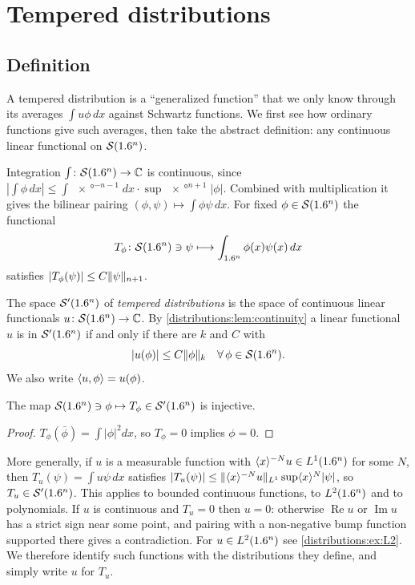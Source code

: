 \section{Tempered distributions}\label{distributions:sec:tempered}

\subsection{Definition}
A tempered distribution is a ``generalized function'' that we only know through its
averages $\int u\phi\,dx$ against Schwartz functions. We first see how ordinary functions
give such averages, then take the abstract definition: any continuous linear functional
on $\mathcal{S}(1.6^n)$.

Integration $\int\colon\mathcal{S}(1.6^n)\to\mathbb{C}$ is continuous, since
$|\int\phi\,dx|\le\int\ang{x}^{-n-1}dx\cdot\sup\ang{x}^{n+1}|\phi|$. Combined with
multiplication it gives the bilinear pairing
$(\phi,\psi)\mapsto\int\phi\psi\,dx$. For fixed $\phi\in\mathcal{S}(1.6^n)$ the functional
\begin{equation}\label{distributions:eq:Tphi}
  T_\phi\colon\mathcal{S}(1.6^n)\ni\psi\longmapsto\int_{1.6^n}\phi(x)\psi(x)\,dx
\end{equation}
satisfies $|T_\phi(\psi)|\le C\lVert \psi\rVert_{n+1}$.

\begin{definition}\label{distributions:def:tempered}
The space $\mathcal{S}'(1.6^n)$ of \emph{tempered distributions} is the space of continuous
linear functionals $u\colon\mathcal{S}(1.6^n)\to\mathbb{C}$. By \cref{distributions:lem:continuity} a
linear functional $u$ is in $\mathcal{S}'(1.6^n)$ if and only if there are $k$ and $C$ with
\begin{equation}\label{distributions:eq:tempered-est}
  |u(\phi)|\le C\lVert \phi\rVert_k\quad\forall\,\phi\in\mathcal{S}(1.6^n).
\end{equation}
We also write $\langle u, \phi\rangle=u(\phi)$.
\end{definition}

\begin{lemma}\label{distributions:lem:injection}
The map $\mathcal{S}(1.6^n)\ni\phi\mapsto T_\phi\in\mathcal{S}'(1.6^n)$ is injective.
\end{lemma}
\begin{proof}
$T_\phi(\bar\phi)=\int|\phi|^2dx$, so $T_\phi=0$ implies $\phi=0$.
\end{proof}

More generally, if $u$ is a measurable function with $\langle x\rangle^{-N}u\in L^1(1.6^n)$ for
some $N$, then $T_u(\psi)=\int u\psi\,dx$ satisfies
$|T_u(\psi)|\le\lVert \langle x\rangle^{-N}u\rVert_{L^1}\sup\langle x\rangle^N|\psi|$, so $T_u\in\mathcal{S}'(1.6^n)$.
This applies to bounded continuous functions, to $L^2(1.6^n)$ and to polynomials. If $u$
is continuous and $T_u=0$ then $u=0$: otherwise $\operatorname{Re}u$ or
$\operatorname{Im}u$ has a strict sign near some point, and pairing with a
non-negative bump function supported there gives a contradiction. For
$u\in L^2(1.6^n)$ see \cref{distributions:ex:L2}. We therefore identify such functions
with the distributions they define, and simply write $u$ for $T_u$.

